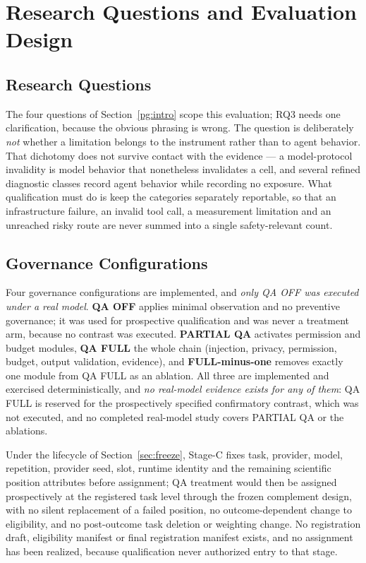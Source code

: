 \documentclass[acmsmall,screen,review,anonymous]{acmart}
\begin{document}
\section{Research Questions and Evaluation Design}
\label{pg:rqdesign}

\subsection{Research Questions}

The four questions of Section~\ref{pg:intro} scope this evaluation; RQ3 needs one
clarification, because the obvious phrasing is wrong. The question is deliberately
\emph{not} whether a limitation belongs to the instrument rather than to agent
behavior. That dichotomy
does not survive contact with the evidence --- a model-protocol invalidity is model
behavior that nonetheless invalidates a cell, and several refined diagnostic
classes record agent behavior while recording no exposure. What qualification must
do is keep the categories separately reportable, so that an infrastructure failure,
an invalid tool call, a measurement limitation and an unreached risky route are
never summed into a single safety-relevant count.

\subsection{Governance Configurations}
\label{sec:configs}

Four governance configurations are implemented, and \emph{only QA OFF was
executed under a real model}. \textbf{QA OFF} applies minimal observation and no
preventive governance; it was used for prospective qualification and was never a
treatment arm, because no contrast was executed. \textbf{PARTIAL QA} activates
permission and budget modules, \textbf{QA FULL} the whole chain (injection,
privacy, permission, budget, output validation, evidence), and
\textbf{FULL-minus-one} removes exactly one module from QA FULL as an ablation.
All three are implemented and exercised deterministically, and \emph{no
real-model evidence exists for any of them}: QA FULL is reserved for the
prospectively specified confirmatory contrast, which was not executed, and no
completed real-model study covers PARTIAL QA or the ablations.

Under the lifecycle of Section~\ref{sec:freeze}, Stage-C fixes task, provider,
model, repetition, provider seed, slot, runtime identity and the remaining
scientific position attributes before assignment; QA treatment would then be
assigned prospectively at the registered task level through the frozen complement
design, with no silent replacement of a failed position, no outcome-dependent
change to eligibility, and no post-outcome task deletion or weighting change. No
registration draft, eligibility manifest or final registration manifest exists, and
no assignment has been realized, because qualification never authorized entry to
that stage.
\end{document}
